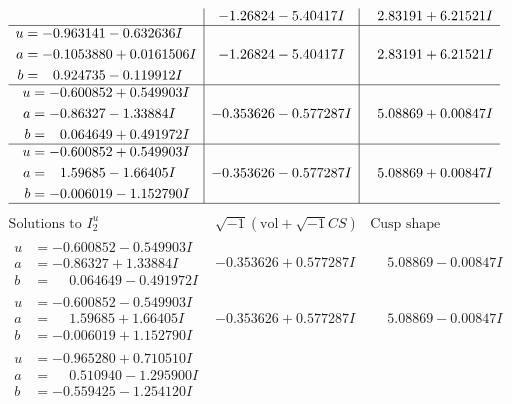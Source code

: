 \documentclass[1p]{elsarticle_modified}
\theoremstyle{definition}
\newcommand{\I}{\sqrt{-1}}
\begin{document}
$$\begin{array}{c|c|c}
 & -1.26824 - 5.40417 I & \phantom{-}2.83191 + 6.21521 I \\ \hline\begin{aligned}
u &= -0.963141 - 0.632636 I \\
a &= -0.1053880 + 0.0161506 I \\
b &= \phantom{-}0.924735 - 0.119912 I\end{aligned}
 & -1.26824 - 5.40417 I & \phantom{-}2.83191 + 6.21521 I \\ \hline\begin{aligned}
u &= -0.600852 + 0.549903 I \\
a &= -0.86327 - 1.33884 I \\
b &= \phantom{-}0.064649 + 0.491972 I\end{aligned}
 & -0.353626 - 0.577287 I & \phantom{-}5.08869 + 0.00847 I \\ \hline\begin{aligned}
u &= -0.600852 + 0.549903 I \\
a &= \phantom{-}1.59685 - 1.66405 I \\
b &= -0.006019 - 1.152790 I\end{aligned}
 & -0.353626 - 0.577287 I & \phantom{-}5.08869 + 0.00847 I\\
 \hline 
 \end{array}$$\newpage$$\begin{array}{c|c|c}  
\text{Solutions to }I^u_{2}& \I (\text{vol} + \sqrt{-1}CS) & \text{Cusp shape}\\
 \hline 
\begin{aligned}
u &= -0.600852 - 0.549903 I \\
a &= -0.86327 + 1.33884 I \\
b &= \phantom{-}0.064649 - 0.491972 I\end{aligned}
 & -0.353626 + 0.577287 I & \phantom{-}5.08869 - 0.00847 I \\ \hline\begin{aligned}
u &= -0.600852 - 0.549903 I \\
a &= \phantom{-}1.59685 + 1.66405 I \\
b &= -0.006019 + 1.152790 I\end{aligned}
 & -0.353626 + 0.577287 I & \phantom{-}5.08869 - 0.00847 I \\ \hline\begin{aligned}
u &= -0.965280 + 0.710510 I \\
a &= \phantom{-}0.510940 - 1.295900 I \\
b &= -0.559425 - 1.254120 I\end{aligned}

\end{array}$$
\end{document}
